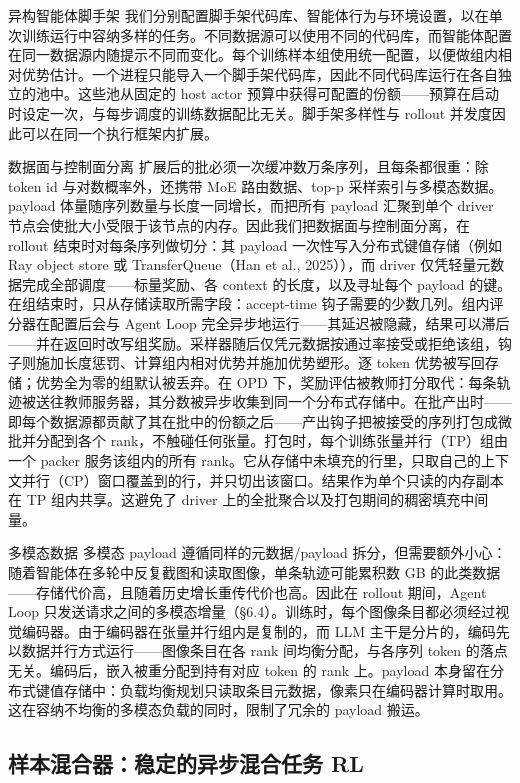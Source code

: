 \documentclass[
  10
]{article}
\begin{document}
异构智能体脚手架 我们分别配置脚手架代码库、智能体行为与环境设置，以在单次训练运行中容纳多样的任务。不同数据源可以使用不同的代码库，而智能体配置在同一数据源内随提示不同而变化。每个训练样本组使用统一配置，以便做组内相对优势估计。一个进程只能导入一个脚手架代码库，因此不同代码库运行在各自独立的池中。这些池从固定的 host actor 预算中获得可配置的份额——预算在启动时设定一次，与每步调度的训练数据配比无关。脚手架多样性与 rollout 并发度因此可以在同一个执行框架内扩展。

数据面与控制面分离 扩展后的批必须一次缓冲数万条序列，且每条都很重：除 token id 与对数概率外，还携带 MoE 路由数据、top-p 采样索引与多模态数据。payload 体量随序列数量与长度一同增长，而把所有 payload 汇聚到单个 driver 节点会使批大小受限于该节点的内存。因此我们把数据面与控制面分离，在 rollout 结束时对每条序列做切分：其 payload 一次性写入分布式键值存储（例如 Ray object store 或 TransferQueue（Han et al., 2025）），而 driver 仅凭轻量元数据完成全部调度——标量奖励、各 context 的长度，以及寻址每个 payload 的键。在组结束时，只从存储读取所需字段：accept-time 钩子需要的少数几列。组内评分器在配置后会与 Agent Loop 完全异步地运行——其延迟被隐藏，结果可以滞后——并在返回时改写组奖励。采样器随后仅凭元数据按通过率接受或拒绝该组，钩子则施加长度惩罚、计算组内相对优势并施加优势塑形。逐 token 优势被写回存储；优势全为零的组默认被丢弃。在 OPD 下，奖励评估被教师打分取代：每条轨迹被送往教师服务器，其分数被异步收集到同一个分布式存储中。在批产出时——即每个数据源都贡献了其在批中的份额之后——产出钩子把被接受的序列打包成微批并分配到各个 rank，不触碰任何张量。打包时，每个训练张量并行（TP）组由一个 packer 服务该组内的所有 rank。它从存储中未填充的行里，只取自己的上下文并行（CP）窗口覆盖到的行，并只切出该窗口。结果作为单个只读的内存副本在 TP 组内共享。这避免了 driver 上的全批聚合以及打包期间的稠密填充中间量。



多模态数据 多模态 payload 遵循同样的元数据/payload 拆分，但需要额外小心：随着智能体在多轮中反复截图和读取图像，单条轨迹可能累积数 GB 的此类数据——存储代价高，且随着历史增长重传代价也高。因此在 rollout 期间，Agent Loop 只发送请求之间的多模态增量（§6.4）。训练时，每个图像条目都必须经过视觉编码器。由于编码器在张量并行组内是复制的，而 LLM 主干是分片的，编码先以数据并行方式运行——图像条目在各 rank 间均衡分配，与各序列 token 的落点无关。编码后，嵌入被重分配到持有对应 token 的 rank 上。payload 本身留在分布式键值存储中：负载均衡规划只读取条目元数据，像素只在编码器计算时取用。这在容纳不均衡的多模态负载的同时，限制了冗余的 payload 搬运。

\subsection{样本混合器：稳定的异步混合任务 RL}\label{sample-mixer-stable-asynchronous-mixed-task-rl}
\end{document}
